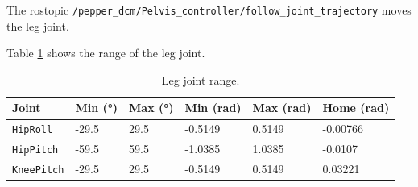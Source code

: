 \documentclass{CSSRforAfrica}
\begin{document}
The rostopic \texttt{/pepper\_dcm/Pelvis\_controller/follow\_joint\_trajectory} moves the leg joint.

Table \ref{tab:leg_joint_range} shows the range of the leg joint.

\begin{longtable}[c]{|l|l|l|l|l|l|} 
    \caption{Leg joint range. \cite{PepperJoints}} \label{tab:leg_joint_range}\\
    \hline
    \rowcolor{gray!30}
    \textbf{Joint} & \textbf{Min (°)} & \textbf{Max (°)} & \textbf{Min (rad)} & \textbf{Max (rad)}  & \textbf{Home (rad)} \\ \hline
    \endhead %
    
    \texttt{HipRoll} & -29.5 & 29.5 & -0.5149 & 0.5149 &  -0.00766  \\ \hline
    \texttt{HipPitch} & -59.5 & 59.5 & -1.0385 & 1.0385 & -0.0107   \\ \hline
    \texttt{KneePitch} & -29.5 & 29.5 & -0.5149 & 0.5149 & 0.03221  \\ \hline
    
\end{longtable}
\end{document}
